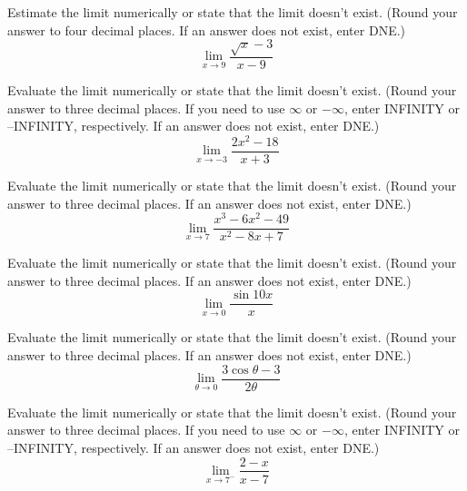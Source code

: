 \documentclass[12pt,addpoints, answers, fleqn]{exam}
\begin{document}
\begin{teacher}
\begin{questions}
Estimate the limit numerically or state that the limit doesn't exist. (Round your answer to four decimal places. If an answer does not exist, enter DNE.)
\[
\lim_{x \to 9} \frac{\sqrt{x} -3}{x-9}
\]
\begin{solution}
\end{solution}

\question 	%

Evaluate the limit numerically or state that the limit doesn't exist. (Round your answer to three decimal places. If you need to use  $\infty$ or $-\infty$, enter INFINITY or –INFINITY, respectively. If an answer does not exist, enter DNE.)
\[
\lim_{x \to -3} \frac{2x^2-18}{x+3}
\]
\begin{solution}
\end{solution}

\question 	%

Evaluate the limit numerically or state that the limit doesn't exist. (Round your answer to three decimal places. If an answer does not exist, enter DNE.)
\[
\lim_{x \to 7} \frac{x^3-6x^2-49}{x^2-8x+7}
\]
\begin{solution}
\end{solution}

\question 	%

Evaluate the limit numerically or state that the limit doesn't exist. (Round your answer to three decimal places. If an answer does not exist, enter DNE.)
\[
\lim_{x \to 0} \frac{\sin 10x}{x}
\]
\begin{solution}
\end{solution}

\question 	%

Evaluate the limit numerically or state that the limit doesn't exist. (Round your answer to three decimal places. If an answer does not exist, enter DNE.)
\[
\lim_{\theta \to 0} \frac{3\cos \theta - 3}{2\theta}
\]
\begin{solution}
\end{solution}

\question 	%

Evaluate the limit numerically or state that the limit doesn't exist. (Round your answer to three decimal places. If you need to use $\infty$ or $-\infty$, enter INFINITY or –INFINITY, respectively. If an answer does not exist, enter DNE.)
\[
\lim_{x\to 7^-} \frac{2-x}{x-7}
\]
\begin{solution}
\end{solution}


\end{questions}
\end{teacher}
\end{document}
